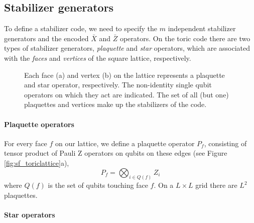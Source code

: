 \subsection{Stabilizer generators}

To define a stabilizer code, we need to specify the $m$ independent stabilizer generators and the encoded $\bar{X}$ and $\bar{Z}$ operators. On the toric code there are two types of stabilizer generators, \emph{plaquette} and \emph{star} operators, which are associated with the \emph{faces} and \emph{vertices} of the square lattice, respectively.

\begin{figure}
  \centering
  \hspace{1cm}
  \caption{Each face (a) and vertex (b) on the lattice represents a plaquette and star operator, respectively. The non-identity single qubit operators on which they act are indicated. The set of all (but one) plaquettes and vertices make up the stabilizers of the code. }\label{fig:sf_stabilizers}
\end{figure}

\paragraph{Plaquette operators}
For every face $f$ on our lattice, we define a plaquette operator $P_f$, consisting of tensor product of Pauli Z operators on qubits on these edges (see Figure \ref{fig:sf_toriclattice}a),
\begin{equation}\label{eq:sf_plaquette}
  P_f = \bigotimes_{i\in Q(f)} Z_i
\end{equation}
where $Q(f)$ is the set of qubits touching face $f$. On a $L\times L$ grid there are $L^2$ plaquettes.

\paragraph{Star operators}

